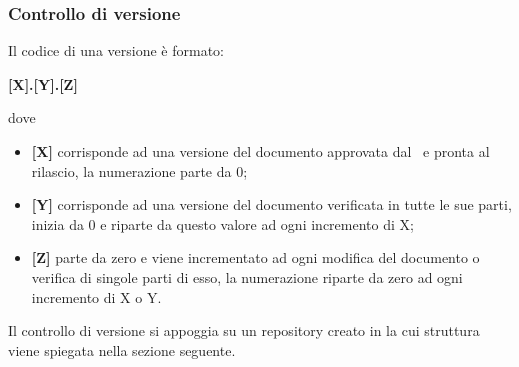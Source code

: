 \subsubsection{Controllo di versione}\label{Versionamento}
Il codice di una versione è formato: 
\begin{center}
	\textbf{[X].[Y].[Z]}
\end{center}
dove 
\begin{itemize}
	\item \textbf{[X]} corrisponde ad una versione del documento approvata dal \Responsabile\ e pronta al rilascio, la numerazione parte da 0;
	\item \textbf{[Y]} corrisponde ad una versione del documento verificata in tutte le sue parti, inizia da 0 e riparte da questo valore ad ogni incremento di X;
	\item \textbf{[Z]} parte da zero e viene incrementato ad ogni modifica del documento o verifica di singole parti di esso, la numerazione riparte da zero ad ogni incremento di X o Y.
\end{itemize}
Il controllo di versione si appoggia su un repository creato in  la cui struttura viene spiegata nella sezione seguente.

